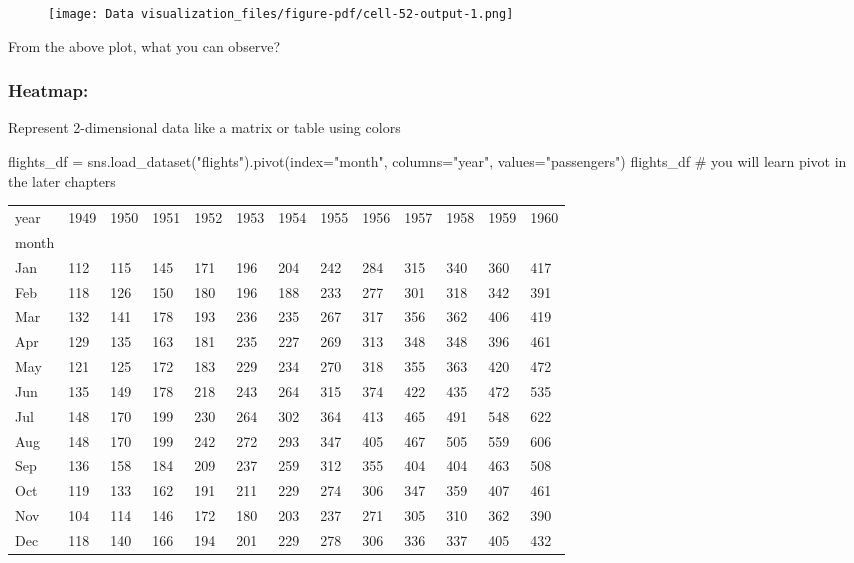 \documentclass[
  letterpaper,
  DIV=11,
  numbers=noendperiod]{scrreprt}
\newenvironment{Shaded}{\begin{snugshade}}{\end{snugshade}}
\newcommand{\CommentTok}[1]{\textcolor[rgb]{0.37,0.37,0.37}{#1}}
\newcommand{\NormalTok}[1]{\textcolor[rgb]{0.00,0.23,0.31}{#1}}
\newcommand{\OperatorTok}[1]{\textcolor[rgb]{0.37,0.37,0.37}{#1}}
\newcommand{\StringTok}[1]{\textcolor[rgb]{0.13,0.47,0.30}{#1}}
\begin{document}
\begin{figure}[H]

{\centering \texttt{[image: Data visualization\_files/figure-pdf/cell-52-output-1.png]}

}

\end{figure}

From the above plot, what you can observe?

\hypertarget{heatmap}{%
\subsubsection{Heatmap:}\label{heatmap}}

Represent 2-dimensional data like a matrix or table using colors

\begin{Shaded}
\begin{Highlighting}[]
\NormalTok{flights\_df }\OperatorTok{=}\NormalTok{ sns.load\_dataset(}\StringTok{"flights"}\NormalTok{).pivot(index}\OperatorTok{=}\StringTok{"month"}\NormalTok{, columns}\OperatorTok{=}\StringTok{"year"}\NormalTok{, values}\OperatorTok{=}\StringTok{"passengers"}\NormalTok{)}
\NormalTok{flights\_df}
\CommentTok{\# you will learn pivot in the later chapters}
\end{Highlighting}
\end{Shaded}

\begin{longtable}[]{@{}lllllllllllll@{}}
\toprule\noalign{}
year & 1949 & 1950 & 1951 & 1952 & 1953 & 1954 & 1955 & 1956 & 1957 &
1958 & 1959 & 1960 \\
month & & & & & & & & & & & & \\
\midrule\noalign{}
\endhead
\bottomrule\noalign{}
\endlastfoot
Jan & 112 & 115 & 145 & 171 & 196 & 204 & 242 & 284 & 315 & 340 & 360 &
417 \\
Feb & 118 & 126 & 150 & 180 & 196 & 188 & 233 & 277 & 301 & 318 & 342 &
391 \\
Mar & 132 & 141 & 178 & 193 & 236 & 235 & 267 & 317 & 356 & 362 & 406 &
419 \\
Apr & 129 & 135 & 163 & 181 & 235 & 227 & 269 & 313 & 348 & 348 & 396 &
461 \\
May & 121 & 125 & 172 & 183 & 229 & 234 & 270 & 318 & 355 & 363 & 420 &
472 \\
Jun & 135 & 149 & 178 & 218 & 243 & 264 & 315 & 374 & 422 & 435 & 472 &
535 \\
Jul & 148 & 170 & 199 & 230 & 264 & 302 & 364 & 413 & 465 & 491 & 548 &
622 \\
Aug & 148 & 170 & 199 & 242 & 272 & 293 & 347 & 405 & 467 & 505 & 559 &
606 \\
Sep & 136 & 158 & 184 & 209 & 237 & 259 & 312 & 355 & 404 & 404 & 463 &
508 \\
Oct & 119 & 133 & 162 & 191 & 211 & 229 & 274 & 306 & 347 & 359 & 407 &
461 \\
Nov & 104 & 114 & 146 & 172 & 180 & 203 & 237 & 271 & 305 & 310 & 362 &
390 \\
Dec & 118 & 140 & 166 & 194 & 201 & 229 & 278 & 306 & 336 & 337 & 405 &
432 \\
\end{longtable}
\end{document}
